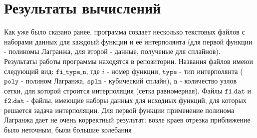 \documentclass[a4paper, fleqn]{report}
\begin{document}
\section*{Результаты вычислений}
Как уже было сказано ранее, программа создает несколько текстовых файлов с наборами данных для каждоый функции и её интерполянта (для первой функции - полиномы Лагранжа, для второй - данные, полученые для сплайнов). Результаты работы программы находятся в репозитории. Названия файлов имеюи следующий вид: \(\texttt{fi\_type\_n}\), где \(i\) - номер функции, \(\texttt{type}\) - тип интерполянта (\(\texttt{poly}\) - полином Лагранжа, \(\texttt{spln}\) - кубический сплайн), \(\texttt{n}\) - количество узлов сетки, для которой строится интерполяция (сетка равномерная). Файлы \(\texttt{f1.dat}\) и \(\texttt{f2.dat}\) - файлы, имеющие наборы данных для исходных функций, для которых решается задача интерполяции. 
Для первой функции применение полинома Лагранжа дает не очень корректный результат: возле краев отрезка приближение было неточным, были большие колебания

\clearpage
\end{document}
